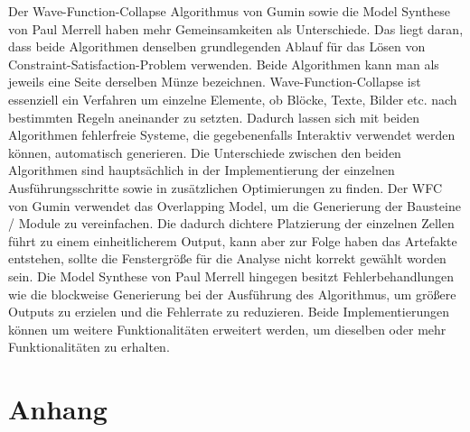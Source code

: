 \documentclass[12pt, a4paper,twoside,openany]{report} %
\begin{document}
Der Wave-Function-Collapse Algorithmus von Gumin sowie die Model Synthese von Paul Merrell haben mehr Gemeinsamkeiten als Unterschiede.
Das liegt daran, dass beide Algorithmen denselben grundlegenden Ablauf für das Lösen von Constraint-Satisfaction-Problem verwenden.
Beide Algorithmen kann man als jeweils eine Seite derselben Münze bezeichnen.
Wave-Function-Collapse ist essenziell ein Verfahren um einzelne Elemente, ob Blöcke, Texte, Bilder etc. nach bestimmten Regeln aneinander zu setzten.
Dadurch lassen sich mit beiden Algorithmen fehlerfreie Systeme, die gegebenenfalls Interaktiv verwendet werden können, automatisch generieren.
Die Unterschiede zwischen den beiden Algorithmen sind hauptsächlich in der Implementierung der einzelnen Ausführungsschritte sowie in zusätzlichen Optimierungen zu finden.
Der WFC von Gumin verwendet das Overlapping Model, um die Generierung der Bausteine / Module zu vereinfachen.
Die dadurch dichtere Platzierung der einzelnen Zellen führt zu einem einheitlicherem Output, kann aber zur Folge haben das Artefakte entstehen,
sollte die Fenstergröße für die Analyse nicht korrekt gewählt worden sein.
Die Model Synthese von Paul Merrell hingegen besitzt Fehlerbehandlungen wie die blockweise Generierung bei der Ausführung des Algorithmus, um größere Outputs zu erzielen und die
Fehlerrate zu reduzieren.
Beide Implementierungen können um weitere Funktionalitäten erweitert werden, um dieselben oder mehr Funktionalitäten zu erhalten.

\printbibliography

\chapter{Anhang}
\end{document}
